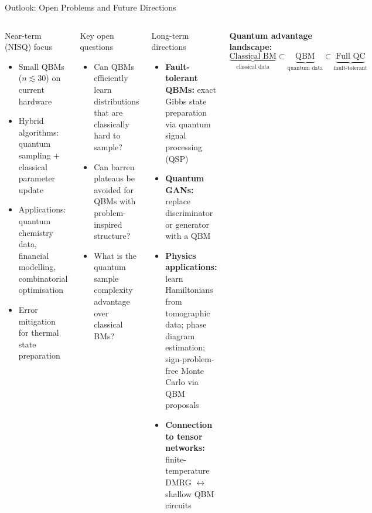 \documentclass[aspectratio=169,10pt]{beamer}
\begin{document}
\begin{frame}{Outlook: Open Problems and Future Directions}
  \begin{columns}[T]
      \begin{block}{Near-term (NISQ) focus}
        \begin{itemize}
          \item Small QBMs ($n\lesssim 30$) on current hardware
          \item Hybrid algorithms: quantum sampling + classical
                parameter update
          \item Applications: quantum chemistry data,
                financial modelling, combinatorial optimisation
          \item Error mitigation for thermal state preparation
        \end{itemize}
      \end{block}
      \vspace{0.2cm}
      \begin{alertblock}{Key open questions}
        \begin{itemize}
          \item Can QBMs efficiently learn distributions
                that are classically hard to sample?
          \item Can barren plateaus be avoided for
                QBMs with problem-inspired structure?
          \item What is the quantum sample complexity
                advantage over classical BMs?
        \end{itemize}
      \end{alertblock}
      \begin{block}{Long-term directions}
        \begin{itemize}
          \item \textbf{Fault-tolerant QBMs:} exact Gibbs
                state preparation via quantum signal
                processing (QSP)
          \item \textbf{Quantum GANs:} replace discriminator
                or generator with a QBM
          \item \textbf{Physics applications:} learn
                Hamiltonians from tomographic data;
                phase diagram estimation; sign-problem-free
                Monte Carlo via QBM proposals
          \item \textbf{Connection to tensor networks:}
                finite-temperature DMRG $\leftrightarrow$
                shallow QBM circuits
        \end{itemize}
      \end{block}
      \vspace{0.2cm}
      \textbf{Quantum advantage landscape:}
      \[
        \underbrace{\text{Classical BM}}_{\text{classical data}}
        \subset
        \underbrace{\text{QBM}}_{\text{quantum data}}
        \subset
        \underbrace{\text{Full QC}}_{\text{fault-tolerant}}
      \]
  \end{columns}
\end{frame}
\end{document}
